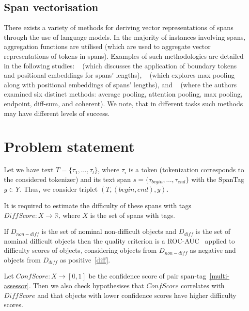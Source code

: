 \documentclass{article}
\begin{document}
\subsection{Span vectorisation}\label{span-vec}
There exists a variety of methods for deriving vector representations of spans through the use of language models. In the majority of instances involving spans, aggregation functions are utilised (which are used to aggregate vector representations of tokens in spans). Examples of such methodologies are detailed in the following studies: ~\cite{joshi2020spanbert} (which discusses the application of boundary tokens and positional embeddings for spans' lengths), ~\cite{eberts2020span} (which explores max pooling along with positional embeddings of spans' lengths), and ~\cite{toshniwal2020cross} (where the authors examined six distinct methods: average pooling, attention pooling, max pooling, endpoint, diff-sum, and coherent). We note, that in different tasks such methods may have different levels of success. 

\section{Problem statement}
Let we have text $T = \{\tau_1, ..., \tau_l\}$, where $\tau_i$ is a token (tokenization corresponds to the considered tokenizer) and its text span $s = \{\tau_{begin}, ..., \tau_{end}\}$ with the SpanTag $y \in Y$. Thus, we consider triplet $(T, (begin, end), y)$.

It is required to estimate the difficulty of these spans with tags $DiffScore: X \rightarrow \mathbb{R}$, where $X$ is the set of spans with tags. 

If $D_{non-diff}$ is the set of nominal non-difficult objects and $D_{diff}$ is the set of nominal difficult objects then the quality criterion is a ROC-AUC~\cite{fawcett2006introduction} applied to difficulty scores of objects, considering objects from $D_{non-diff}$ as negative and objects from $D_{diff}$ as positive~\ref{diff}.  

Let $ConfScore: X \rightarrow [0,1]$ be the confidence score of pair span-tag~\ref{multi-assessor}. Then we also check hypothesises that $ConfScore$ correlates with $DiffScore$ and that objects with lower confidence scores have higher difficulty scores.



\end{document}
